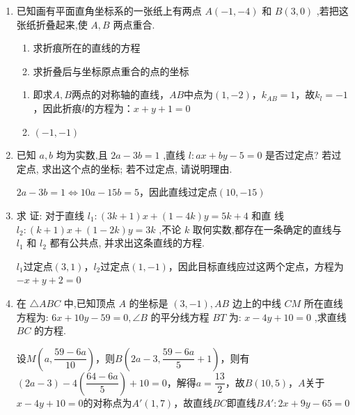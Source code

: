 \begin{enumerate}
    
    \item 已知画有平面直角坐标系的一张纸上有两点 $A\left( {-1, - 4}\right)$ 和 $B\left( {3,0}\right)$ ,若把这张纸折叠起来,使 $A,B$ 两点重合.
    \begin{enumerate}
        \item 求折痕所在的直线的方程
        \item 求折叠后与坐标原点重合的点的坐标
    \end{enumerate}
    \begin{jieda}
        \begin{enumerate}
            \item 即求$A,B$两点的对称轴的直线，$AB$中点为$(1, -2)$，$k_{AB} = 1$，故$k_l = -1$，因此折痕$l$的方程为：$x+y+1=0$
            \item $(-1, -1)$
        \end{enumerate}
    \end{jieda}
    
    \item 已知 $a,b$ 均为实数,且 ${2a} - {3b} = 1$ ,直线 $l : {ax} + {by} - 5 = 0$ 是否过定点? 若过定点, 求出这个点的坐标; 若不过定点, 请说明理由.
    \begin{jieda}
        ${2a} - {3b} = 1 \Longleftrightarrow {10a} - {15b} = 5$，因此直线过定点$(10, -15)$
    \end{jieda}
    
    \item 求 证: 对于直线 ${l}_{1} : \left( {{3k} + 1}\right) x + \left( {1 - {4k}}\right) y = {5k} + 4$ 和直 线 ${l}_{2} : \left( {k + 1}\right) x + \left( {1 - {2k}}\right) y = {3k}$ ,不论 $k$ 取何实数,都存在一条确定的直线与 ${l}_{1}$ 和 ${l}_{2}$ 都有公共点, 并求出这条直线的方程.
    \begin{jieda}
        $l_1$过定点$(3, 1)$，$l_2$过定点$(1, -1)$，因此目标直线应过这两个定点，方程为$-x+y+2=0$
    \end{jieda}

    \item 在 $\bigtriangleup {ABC}$ 中,已知顶点 $A$ 的坐标是 $\left( {3, - 1}\right) ,{AB}$ 边上的中线 ${CM}$ 所在直线方程为: ${6x} + {10y} - {59} = 0,\angle B$ 的平分线方程 ${BT}$ 为: $x - {4y} + {10} = 0$ ,求直线 ${BC}$ 的方程.
    \begin{jieda}
        设$M\left(a, \dfrac{59-6a}{10}\right)$，则$B\left(2a-3, \dfrac{59-6a}{5}+1\right)$，则有$(2a-3)-4\left(\dfrac{64-6a}{5}\right) + 10 = 0$，解得$a = \dfrac{13}{2}$，故$B\left(10, 5\right)$，$A$关于$x - {4y} + {10} = 0$的对称点为$A'(1, 7)$，故直线$BC$即直线$BA': 2x+9y-65=0$
    \end{jieda}
    

\end{enumerate}
